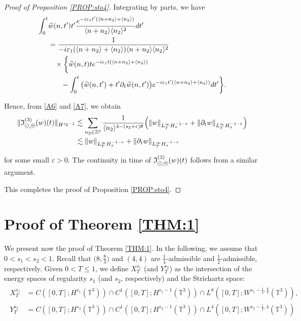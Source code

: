 \documentclass[%
11pt,  reqno]{amsart}
\newcommand{\pe}{\mathbin{\scaleobj{0.7}{\tikz \draw (0,0) node[shape=circle,draw,inner sep=0pt,minimum size=8.5pt] {\scriptsize  $=$};}}}
\newcommand{\pl}{\mathbin{\scaleobj{0.7}{\tikz \draw (0,0) node[shape=circle,draw,inner sep=0pt,minimum size=8.5pt] {\scriptsize $<$};}}}
\newcommand{\1}{\hspace{0.2mm}\text{I}\hspace{0.2mm}}
\newcommand{\noi}{\noindent}
\newcommand{\Z}{\mathbb{Z}}
\newcommand{\T}{\mathbb{T}}
\newcommand{\eps}{\varepsilon}
\newcommand{\ft}{\widehat}
\newcommand{\dt}{\partial_t}
\newcommand{\les}{\lesssim}
\newcommand{\jb}[1]
{\langle #1 \rangle}
\newcommand{\If}{\mathfrak{I}}
\numberwithin{equation}{section}
\numberwithin{theorem}{section}
\begin{document}
\begin{proof}[Proof of Proposition \ref{PROP:sto4}]
\noi
Integrating by parts, we have
\begin{align}
\begin{split}
    \int_0^{t} 
& \ft w(n, t') t'    \frac{e^{ - i \eps_1   t'( \jb{n + n_2 }+ \jb{n_2})}}{  \jb{ n + n_2} \jb{n_2}^2} dt'\\
& = 
\frac{1}{ - i \eps_1   ( \jb{n + n_2 }+ \jb{n_2})\jb{ n + n_2} \jb{n_2}^2}\\
& \hphantom{X}
\times \bigg\{
\ft w(n, t) t e^{ - i \eps_1   t( \jb{n + n_2 }+ \jb{n_2})}\\
& \hphantom{XX}
 -     \int_0^{t} 
\big(\ft w(n, t')  + t' \dt\ft w(n, t') \big)   e^{ - i \eps_1   t'( \jb{n + n_2 }+ \jb{n_2})} dt'\bigg\}.
\end{split}
\label{A7}
\end{align}


\noi
Hence, from \eqref{A6} and \eqref{A7}, we obtain
\begin{align*}
\|\If_{\pl, \pe}^{(3)}(w) (t)\|_{H^{s_2 - 1}}
&  \les 
\sum_{n_2 \in \Z^3}
\frac{1}{\jb{n_2}^{4 - (s_2 + \eps) \theta}}
\Big(
\|w\|_{L^\infty_T H^{-1-\eps}_x} 
+ \|\dt w\|_{L^\infty_T H^{-1-\eps}_x} \Big)\\
&  \les 
\|w\|_{L^\infty_T H^{-1-\eps}_x} 
+ \|\dt w\|_{L^\infty_T H^{-1-\eps}_x}
\end{align*}

\noi
for some small $\eps > 0$.
The continuity in time of $\If_{\pl, \pe}^{(3)}(w)(t)$ follows from a similar argument.

This completes the proof of Proposition \ref{PROP:sto4}.
\end{proof}










\section{Proof of Theorem \ref{THM:1}}
\label{SEC:proof1}

We present now the proof of Theorem \ref{THM:1}.
In the following, we assume that $0 < s_1< s_2 < 1$.
Recall that 
$\big(8, \frac{8}{3}\big)$ 
and $(4, 4)$ are $\frac 14$-admissible
and  $\frac 12$-admissible, respectively.
Given $0 < T \leq 1$, 
we define $X^{s_1}_T$
(and $Y^{s_2}_T$) as the intersection of the energy spaces of regularity  $s_1$ 
(and $s_2$, respectively) and the Strichartz space:
\begin{align}
\begin{split}
 X^{s_1}_T 
 & = C([0,T];H^{s_1}(\T^3))\cap C^1([0,T]; H^{s_1-1}(\T^3))
 \cap L^8([0, T]; W^{s_1-\frac 14, \frac{8}{3}}(\T^3)),\\
 Y^{s_2}_T 
 & = C([0,T];H^{s_2}(\T^3))\cap C^1([0,T]; H^{s_2-1}(\T^3))
 \cap L^4([0, T]; W^{s_2 - \frac 12, 4}(\T^3))
\end{split}
 \label{M0}
\end{align}
\end{document}
